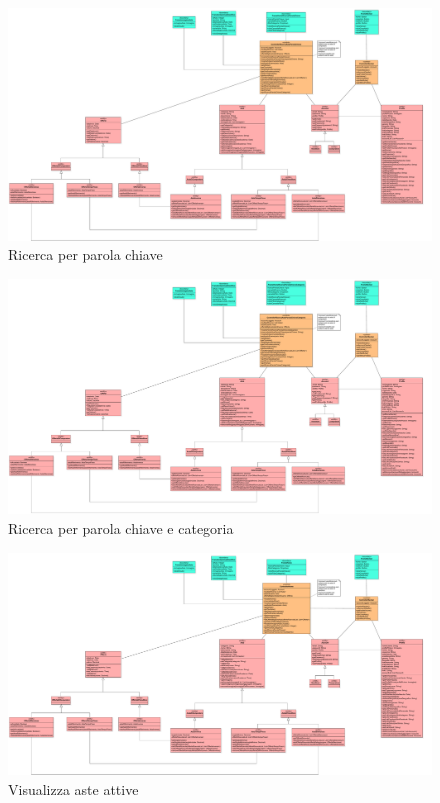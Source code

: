             \begin{figure}[htbp!]
                \centering
                    \includegraphics[width=1\linewidth]{Immagini/Diagrammi/Class Diagram/Utente generico/RicercaParolaChiave.pdf}
                \caption{Ricerca per parola chiave}
            \end{figure}
            
            \begin{figure}[htbp!]
                \centering
                    \includegraphics[width=1\linewidth]{Immagini/Diagrammi/Class Diagram/Utente generico/RicercaParolaChiaveCategoria.pdf}
                \caption{Ricerca per parola chiave e categoria}
            \end{figure}
            
            \begin{figure}[htbp!]
                \centering
                    \includegraphics[width=1\linewidth]{Immagini/Diagrammi/Class Diagram/Utente generico/VisualizzaAsteAttive.pdf}
                \caption{Visualizza aste attive}
            \end{figure}
            
